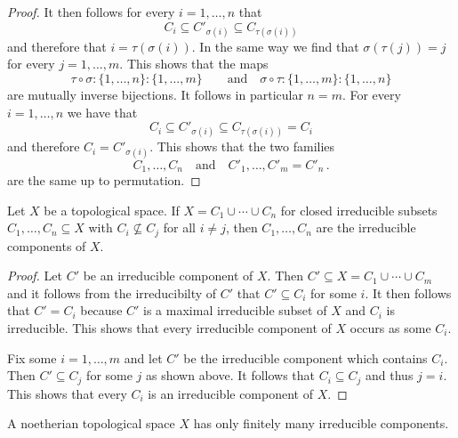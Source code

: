 \begin{proof}
  It then follows for every $i = 1, \dotsc, n$ that
  \[
              C_i
    \subseteq C'_{\sigma(i)}
    \subseteq C_{\tau(\sigma(i))}
  \]
  and therefore that $i = \tau(\sigma(i))$.
  In the same way we find that $\sigma(\tau(j)) = j$ for every $j = 1, \dotsc, m$.
  This shows that the maps
  \[
            \tau \circ \sigma
    \colon  \{1, \dotsc, n\}
    \colon  \{1, \dotsc, m\}
    \qquad\text{and}\quad
            \sigma \circ \tau
    \colon  \{1, \dotsc, m\}
    \colon  \{1, \dotsc, n\}
  \]
  are mutually inverse bijections.
  It follows in particular $n = m$.
  For every $i = 1, \dotsc, n$ we have that
  \[
              C_i
    \subseteq C'_{\sigma(i)}
    \subseteq C_{\tau(\sigma(i))}
    =         C_i
  \]
  and therefore $C_i = C'_{\sigma(i)}$.
  This shows that the two families
  \[
    C_1, \dotsc, C_n
    \quad\text{and}\quad
    C'_1, \dotsc, C'_m = C'_n \,.
  \]
  are the same up to permutation.
\end{proof}


\begin{lemma}
  \label{lemma: recognizing irreducible components}
  Let $X$ be a topological space.
  If $X = C_1 \cup \dotsb \cup C_n$ for closed irreducible subsets $C_1, \dotsc, C_n \subseteq X$ with $C_i \nsubseteq C_j$ for all $i \neq j$, then $C_1, \dotsc, C_n$ are the irreducible components of $X$.
\end{lemma}


\begin{proof}
  Let $C'$ be an irreducible component of $X$.
  Then $C' \subseteq X = C_1 \cup \dotsb \cup C_m$ and it follows from the irreducibilty of $C'$ that $C' \subseteq C_i$ for some $i$.
  It then follows that $C' = C_i$ because $C'$ is a maximal irreducible subset of $X$ and $C_i$ is irreducible.
  This shows that every irreducible component of $X$ occurs as some $C_i$.
  
  Fix some $i = 1, \dotsc, m$ and let $C'$ be the irreducible component which contains $C_i$.
  Then $C' \subseteq C_j$ for some $j$ as shown above.
  It follows that $C_i \subseteq C_j$ and thus $j = i$.
  This shows that every $C_i$ is an irreducible component of $X$.
\end{proof}


\begin{corollary}
  \label{corollary: noetherian spaces have only finitely many irreducible components}
  A noetherian topological space $X$ has only finitely many irreducible components.
\end{corollary}


